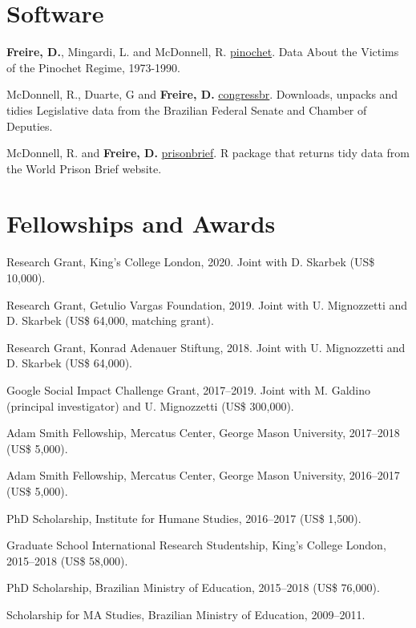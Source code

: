 \documentclass[a4paper]{article}
\renewenvironment{itemize}{
	\begin{list}{}{
			\setlength{\leftmargin}{1.5em}
		}
		}{
	\end{list}
}
\begin{document}
\section*{Software}

\begin{itemize}
\item \textbf{Freire, D.}, Mingardi, L. and McDonnell, R. \href{http://danilofreire.github.io/pinochet}{pinochet}. Data About the Victims of the Pinochet Regime, 1973-1990.
\item McDonnell, R., Duarte, G and \textbf{Freire, D.} \href{https://github.com/RobertMyles/congressbr}{congressbr}. Downloads, unpacks and tidies Legislative data from the Brazilian Federal Senate and Chamber of Deputies.
\item McDonnell, R. and \textbf{Freire, D.} \href{http://danilofreire.github.io/prisonbrief}{prisonbrief}. R package that returns tidy data from the World Prison Brief website.
\end{itemize}

\section*{Fellowships and Awards}

\begin{itemize}
\item Research Grant, King's College London, 2020. Joint with D. Skarbek (US\$ 10,000).
\item Research Grant, Getulio Vargas Foundation, 2019. Joint with U. Mignozzetti and D. Skarbek (US\$ 64,000, matching grant).
\item Research Grant, Konrad Adenauer Stiftung, 2018. Joint with U. Mignozzetti and D. Skarbek (US\$ 64,000).
\item Google Social Impact Challenge Grant, 2017--2019. Joint with M. Galdino (principal investigator) and U. Mignozzetti (US\$ 300,000).
\item Adam Smith Fellowship, Mercatus Center, George Mason University, 2017--2018 (US\$ 5,000).
\item Adam Smith Fellowship, Mercatus Center, George Mason University, 2016--2017 (US\$ 5,000).
\item PhD Scholarship, Institute for Humane Studies, 2016--2017 (US\$ 1,500).
\item Graduate School International Research Studentship, King's College London, 2015--2018 (US\$ 58,000).
\item PhD Scholarship, Brazilian Ministry of Education, 2015--2018 (US\$ 76,000).
\item Scholarship for MA Studies, Brazilian Ministry of Education, 2009--2011.
\end{itemize}
\end{document}
